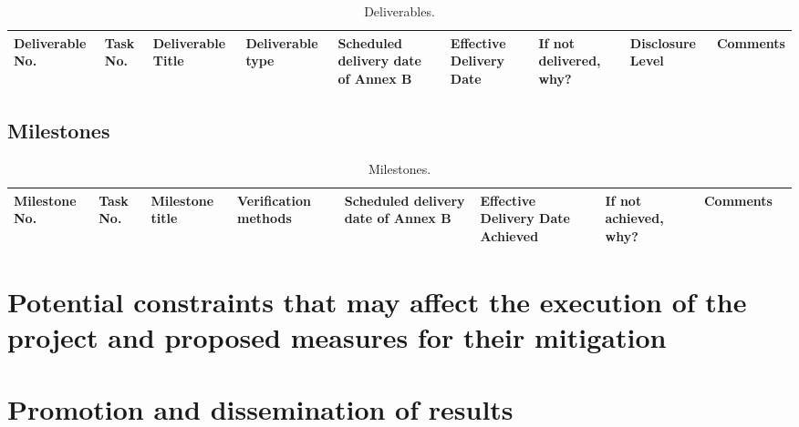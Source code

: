 \documentclass{ani-intermediate}
\begin{document}
  \newpage
  \begin{landscape}
    
    \begin{table}
      \centering
      \scriptsize
      \begin{tabular}{|p{}|p{}|p{}|p{}|p{}|p{}|p{}|p{}|p{}|}
        \hline
        Deliverable No. & Task No. & Deliverable Title & Deliverable type & Scheduled delivery date of Annex B & Effective Delivery Date & If not delivered, why? & Disclosure Level & Comments \\ \hline
      \end{tabular}
      \caption{Deliverables.}
    \end{table}
  \end{landscape}
  
  \newpage
  \subsection{Milestones}
  \lipsum[10-12]

  \newpage
  \begin{landscape}
    \begin{table}
      \center
      \scriptsize
      \begin{tabular}{|p{}|p{}|p{}|p{}|p{}|p{}|p{}|p{}|p{}|}
        \hline
        Milestone No. & Task No. & Milestone title & Verification methods & Scheduled delivery date of Annex B & Effective Delivery Date Achieved & If not achieved, why? & Comments \\ \hline
      \end{tabular}
      \caption{Milestones.}
    \end{table}
  \end{landscape}
  \newpage

\section{Potential constraints that may affect the execution of the project and proposed measures for their mitigation}
\lipsum[13-20]

\section{Promotion and dissemination of results}
\lipsum[20-24]
\end{document}

